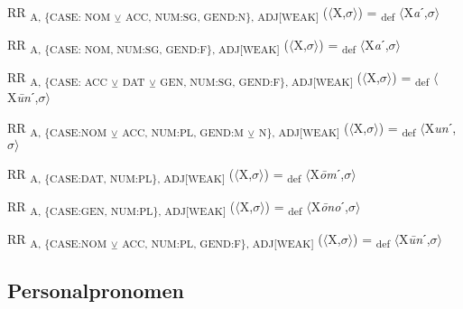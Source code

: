 {\begin{exe}
 RR \textsubscript{A, \{CASE: NOM} \textsubscript{${\veebar}$} \textsubscript{ACC, NUM:SG, GEND:N\}, ADJ[WEAK]} ($\langle$X,$\sigma $$\rangle$) = \textsubscript{def} $\langle$X\textit{a}ˊ,$\sigma $$\rangle$
\end{exe}

\begin{exe}
 RR \textsubscript{A, \{CASE: NOM, NUM:SG, GEND:F\}, ADJ[WEAK]} ($\langle$X,$\sigma $$\rangle$) = \textsubscript{def} $\langle$X\textit{a}ˊ,$\sigma $$\rangle$
\end{exe}

\begin{exe}
 RR \textsubscript{A, \{CASE: ACC} \textsubscript{${\veebar}$} \textsubscript{DAT}\textsubscript{ ${\veebar}$}\textsubscript{ GEN, NUM:SG, GEND:F\}, ADJ[WEAK]} ($\langle$X,$\sigma $$\rangle$) = \textsubscript{def} $\langle$X\textit{\=un}ˊ,$\sigma $$\rangle$
\end{exe}

\begin{exe}
 RR \textsubscript{A, \{CASE:NOM} \textsubscript{${\veebar}$} \textsubscript{ACC, NUM:PL, GEND:M} \textsubscript{${\veebar}$} \textsubscript{N\}, ADJ[WEAK]} ($\langle$X,$\sigma $$\rangle$) = \textsubscript{def} $\langle$X\textit{un}ˊ,$\sigma $$\rangle$
\end{exe}

\begin{exe}
 RR \textsubscript{A, \{CASE:DAT, NUM:PL\}, ADJ[WEAK]} ($\langle$X,$\sigma $$\rangle$) = \textsubscript{def} $\langle$X\textit{\=om}ˊ,$\sigma $$\rangle$
\end{exe}

\begin{exe}
 RR \textsubscript{A, \{CASE:GEN, NUM:PL\}, ADJ[WEAK]} ($\langle$X,$\sigma $$\rangle$) = \textsubscript{def} $\langle$X\textit{\=ono}ˊ,$\sigma $$\rangle$
\end{exe}

\begin{exe}
 RR \textsubscript{A, \{CASE:NOM} \textsubscript{${\veebar}$} \textsubscript{ACC, NUM:PL, GEND:F\}, ADJ[WEAK]} ($\langle$X,$\sigma $$\rangle$) = \textsubscript{def} $\langle$X\textit{\=un}ˊ,$\sigma $$\rangle$
\end{exe}

\subsection{Personalpronomen}

}
